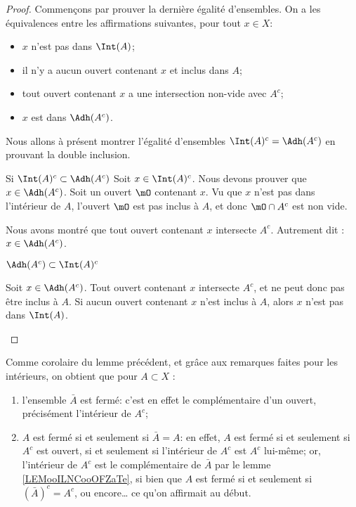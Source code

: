 \begin{proof}
	Commençons par prouver la dernière égalité d'ensembles. On a les équivalences entre les affirmations suivantes, pour tout $x \in X$:
	\begin{itemize}
		\item \( x\) n'est pas dans \( \Int(A)\);
		\item il n'y a aucun ouvert contenant \( x\) et inclus dans \( A\);
		\item tout ouvert contenant \( x\) a une intersection non-vide avec \( A^c\);
		\item \( x\) est dans \( \Adh({A^c})\).
	\end{itemize}
	Nous allons à présent montrer l'égalité d'ensembles \( \Int(A)^c=\Adh(A^c) \) en prouvant la double inclusion.
	\begin{subproof}
		\item[Si \( \Int(A)^c\subset \Adh(A^c)\)]
		Soit \( x\in \Int(A)^c\). Nous devons prouver que \( x\in \Adh(A^c)\). Soit un ouvert \( \mO\) contenant \( x\). Vu que \( x\) n'est pas dans l'intérieur de \( A\), l'ouvert \( \mO\) est pas inclus à \( A\), et donc \( \mO\cap A^c\) est non vide.

		Nous avons montré que tout ouvert contenant \( x\) intersecte \( A^c\). Autrement dit : \( x\in\Adh(A^c)\).

		\item[\( \Adh(A^c)\subset\Int(A)^c\)]

		Soit \( x\in \Adh(A^c)\). Tout ouvert contenant \( x\) intersecte \( A^c\), et ne peut donc pas être inclus à \( A\). Si aucun ouvert contenant \( x\) n'est inclus à \( A\), alors \( x\) n'est pas dans \( \Int(A)\).
	\end{subproof}
\end{proof}

\begin{remark}\label{RemAdhFerme}
	Comme corolaire du lemme précédent, et grâce aux remarques faites pour les intérieurs, on obtient que pour \( A \subset X \) :
	\begin{enumerate}
		\item l'ensemble \( \bar A \) est fermé: c'est en effet le complémentaire d'un ouvert, précisément l'intérieur de \( A^c \);
		\item \( A \) est fermé si et seulement si \( \bar A = A \): en effet, \( A \) est fermé si et seulement si \( A^c \) est ouvert, si et seulement si l'intérieur de \( A^c \) est \( A^c \) lui-même; or, l'intérieur de \( A^c \) est le complémentaire de \( \bar A \) par le lemme \ref{LEMooILNCooOFZaTe}, si bien que \( A \) est fermé si et seulement si \( (\bar A)^c  = A^c \), ou encore\dots{} ce qu'on affirmait au début.
	\end{enumerate}
\end{remark}

